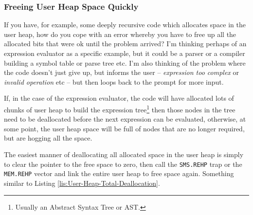 \subsubsection{Freeing User Heap Space Quickly}

If you have, for example, some deeply recursive code which allocates
space in the user heap, how do you cope with an error whereby you
have to free up all the allocated bits that were ok until the problem
arrived? I'm thinking perhaps of an expression evaluator as a specific
example, but it could be a parser or a compiler building a symbol
table or parse tree etc. I'm also thinking of the problem where the
code doesn't just give up, but informs the user -- \emph{expression
too complex} or \emph{invalid operation} etc -- but then loops back
to the prompt for more input.

If, in the case of the expression evaluator, the code will have allocated
lots of chunks of user heap to build the expression tree\footnote{Usually an Abstract Syntax Tree or AST.}
then those nodes in the tree need to be deallocated before the next
expression can be evaluated, otherwise, at some point, the user heap
space will be full of nodes that are no longer required, but are hogging
all the space.

The easiest manner of deallocating all allocated space in the user
heap is simply to clear the pointer to the free space to zero, then
call the \texttt{SMS.REHP} trap or the \texttt{MEM.REHP} vector and
link the entire user heap to free space again. Something similar to
Listing \ref{lis:User-Heap-Total-Deallocation}.

